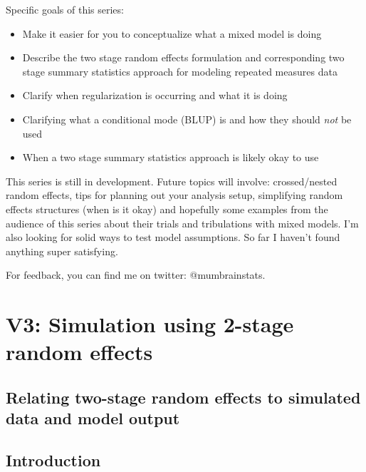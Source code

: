 \documentclass[
]{book}
\providecommand{\tightlist}{%
  \setlength{\itemsep}{0pt}\setlength{\parskip}{0pt}}
\begin{document}
Specific goals of this series:

\begin{itemize}
\tightlist
\item
  Make it easier for you to conceptualize what a mixed model is doing
\item
  Describe the two stage random effects formulation and corresponding two stage summary statistics approach for modeling repeated measures data
\item
  Clarify when regularization is occurring and what it is doing
\item
  Clarifying what a conditional mode (BLUP) is and how they should \emph{not} be used
\item
  When a two stage summary statistics approach is likely okay to use
\end{itemize}

This series is still in development. Future topics will involve: crossed/nested random effects, tips for planning out your analysis setup, simplifying random effects structures (when is it okay) and hopefully some examples from the audience of this series about their trials and tribulations with mixed models. I'm also looking for solid ways to test model assumptions. So far I haven't found anything super satisfying.

For feedback, you can find me on twitter: @mumbrainstats.

\hypertarget{v3-simulation-using-2-stage-random-effects}{%
\chapter{V3: Simulation using 2-stage random effects}\label{v3-simulation-using-2-stage-random-effects}}

\hypertarget{relating-two-stage-random-effects-to-simulated-data-and-model-output}{%
\section{Relating two-stage random effects to simulated data and model output}\label{relating-two-stage-random-effects-to-simulated-data-and-model-output}}

\hypertarget{introduction-1}{%
\section{Introduction}\label{introduction-1}}
\end{document}
